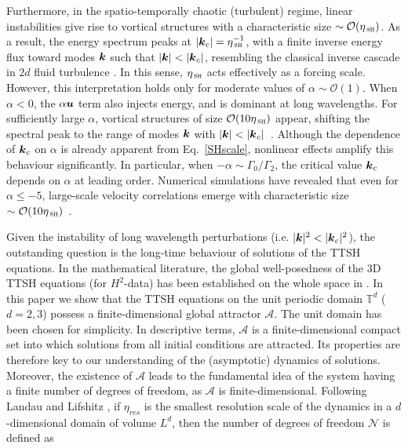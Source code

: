 \documentclass[11pt]{amsart}
\newcommand{\bk}{\mbox{\boldmath$k$}}
\newcommand{\bu}{\mbox{\boldmath$u$}}
\newcommand{\Att}{\mathcal{A}}
\theoremstyle{definition}
\numberwithin{equation}{section}
\numberwithin{equation}{section}
\begin{document}
\par\smallskip%
Furthermore, in the spatio-temporally chaotic (turbulent) regime, linear instabilities give rise to vortical structures with a characteristic size $\sim\mathcal{O}(\eta_{\,\textsc{sh}})$. As a result, the energy spectrum peaks at $\lvert \bk_c \rvert = \eta_{\,\textsc{sh}}^{-1}$, with a finite inverse energy flux toward modes $\bk$ such that $\lvert \bk \rvert < \lvert \bk_c \rvert$, resembling the classical inverse cascade in $2d$ fluid turbulence \cite{bratanov2015new,cp2020friction,Boffetta2012two,pandit2017overview}. In this sense, $\eta_{\,\textsc{sh}}$ acts effectively as a forcing scale. However, this interpretation holds only for moderate values of $\alpha \sim \mathcal{O}(1)$. When $\alpha<0$, the $\alpha\bu$ term also injects energy, and is dominant at long wavelengths. For sufficiently large $\alpha$, vortical structures of size $\mathcal{O}(10\eta_{\,\textsc{sh}})$ appear, shifting the spectral peak to the range of modes $\bk$ with $\lvert \bk \rvert < \lvert \bk_c \rvert$~\cite{mukherjee2021anomalous,SSR1,Pandit_2025,kashyap2025emergence}. Although the dependence of $\bk_c$ on $\alpha$ is already apparent from Eq.~\eqref{SHscale}, nonlinear effects amplify this behaviour significantly. In particular, when $-\alpha\sim \Gamma_0/\Gamma_2$, the critical value $\bk_c$ depends on $\alpha$ at leading order. Numerical simulations have revealed that even for $\alpha\leq-5$, large-scale velocity correlations emerge with characteristic size $\sim \mathcal{O}(10\eta_{\,\textsc{sh}})$~\cite{mukherjee2021anomalous,SSR1,Boff2023,kiran2025onset,kashyap2025emergence}.
\par\smallskip
Given the instability of long wavelength perturbations (i.e. $\lvert \bk \rvert^{2} < \lvert \bk_{c} \rvert^{2}$), the outstanding question is the long-time behaviour of solutions of the TTSH equations.  In the mathematical literature, the global well-posedness of the 3D TTSH equations (for $H^2$-data) has been established on the whole space in \cite{Zanger2016}. In this paper we show that the TTSH equations on the unit periodic domain $\mathbb{T}^d$ ($d=2,3$) possess a finite-dimensional global attractor $\Att$. The unit domain has been chosen for simplicity. In descriptive terms, $\Att$ is a finite-dimensional compact set into which solutions from all initial conditions are attracted. Its properties are therefore key to our understanding of the (asymptotic) dynamics of solutions. Moreover, the existence of $\Att$ leads to the fundamental idea of the system having a finite number of degrees of freedom, as $\Att$ is finite-dimensional.  Following Landau and Lifshitz \cite{LandauLifshitz6}, if $\eta_{res}$ is the smallest resolution scale of the dynamics in a $d$-dimensional domain of volume $L^{d}$, then the number of degrees of freedom $\mathcal{N}$ is defined as
\end{document}
